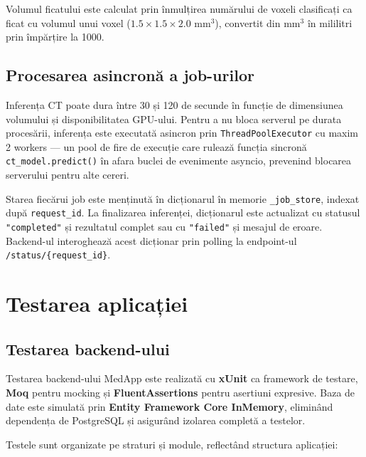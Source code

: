 \documentclass[12pt, a4paper]{report}
\begin{document}
Volumul ficatului este calculat prin înmulțirea numărului de voxeli clasificați
ca ficat cu volumul unui voxel ($1.5 \times 1.5 \times 2.0$ mm$^3$), convertit
din mm$^3$ în mililitri prin împărțire la 1000.

\subsection{Procesarea asincronă a job-urilor}

Inferența CT poate dura între 30 și 120 de secunde în funcție de dimensiunea
volumului și disponibilitatea GPU-ului. Pentru a nu bloca serverul pe durata
procesării, inferența este executată asincron prin \texttt{ThreadPoolExecutor}
cu maxim 2 workers --- un pool de fire de execuție care rulează funcția
sincronă \texttt{ct\_model.predict()} în afara buclei de evenimente asyncio,
prevenind blocarea serverului pentru alte cereri.

Starea fiecărui job este menținută în dicționarul în memorie \texttt{\_job\_store},
indexat după \texttt{request\_id}. La finalizarea inferenței, dicționarul este
actualizat cu statusul \texttt{"completed"} și rezultatul complet sau cu
\texttt{"failed"} și mesajul de eroare. Backend-ul interoghează acest dicționar
prin polling la endpoint-ul \texttt{/status/\{request\_id\}}.


\section{Testarea aplicației}

\subsection{Testarea backend-ului}

Testarea backend-ului MedApp este realizată cu \textbf{xUnit} ca framework
de testare, \textbf{Moq} pentru mocking și \textbf{FluentAssertions} pentru
asertiuni expresive. Baza de date este simulată prin
\textbf{Entity Framework Core InMemory}, eliminând dependența de PostgreSQL
și asigurând izolarea completă a testelor.

Testele sunt organizate pe straturi și module, reflectând structura
aplicației:
\end{document}
